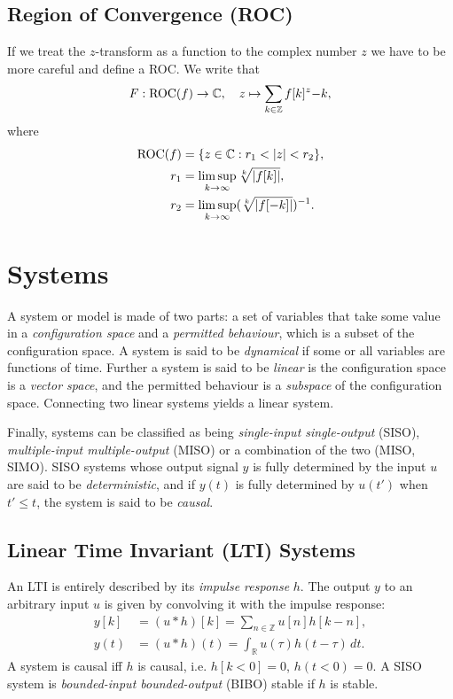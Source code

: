 \subsection{Region of Convergence (ROC)}


If we treat the $z$-transform as a function to the complex number $z$ we have
to be more careful and define a ROC. We write that
\[
	F : \operatorname{ROC}(f) \to \mathbb{C}, \quad
	z \mapsto \sum_{k\in\mathbb{Z}} f[k]^z{-k},
\]
where
\begin{align*}
	\operatorname{ROC}(f) &= \{z \in \mathbb{C} : r_1 < |z| < r_2\}, \\
	r_1 &= \limsup_{k\to\infty} \sqrt[k]{|f[k]|}, \\
	r_2 &= \limsup_{k\to\infty} (\sqrt[k]{|f[-k]|})^{-1}.
\end{align*}

\section{Systems}

A system or model is made of two parts: a set of variables that take some
value in a \emph{configuration space} and a \emph{permitted behaviour}, which
is a subset of the configuration space. A system is said to be
\emph{dynamical} if some or all variables are functions of time. Further a
system is said to be \emph{linear} is the configuration space is a
\emph{vector space}, and the permitted behaviour is a \emph{subspace} of the
configuration space. Connecting two linear systems yields a linear system.

Finally, systems can be classified as being \emph{single-input single-output}
(SISO), \emph{multiple-input multiple-output} (MISO) or a combination of the
two (MISO, SIMO). SISO systems whose output signal $y$ is fully determined by the
input $u$ are said to be \emph{deterministic}, and if $y(t)$ is fully determined
by $u(t')$ when $t' \leq t$, the system is said to be \emph{causal}.

\subsection{Linear Time Invariant (LTI) Systems}

An LTI is entirely described by its \emph{impulse response} $h$. The output
$y$ to an arbitrary input $u$ is given by convolving it with the impulse
response:
\begin{align*}
	y[k] &= (u * h)[k] = \sum_{n\in\mathbb{Z}} u[n] h[k - n], \\
	y(t) &= (u * h)(t) = \int_\mathbb{R} u(\tau) h(t - \tau) \, dt.
\end{align*}
A system is causal iff $h$ is causal, i.e. $h[k < 0] = 0$, $h(t < 0) = 0$. A
SISO system is \emph{bounded-input bounded-output} (BIBO) stable if $h$ is
stable.

